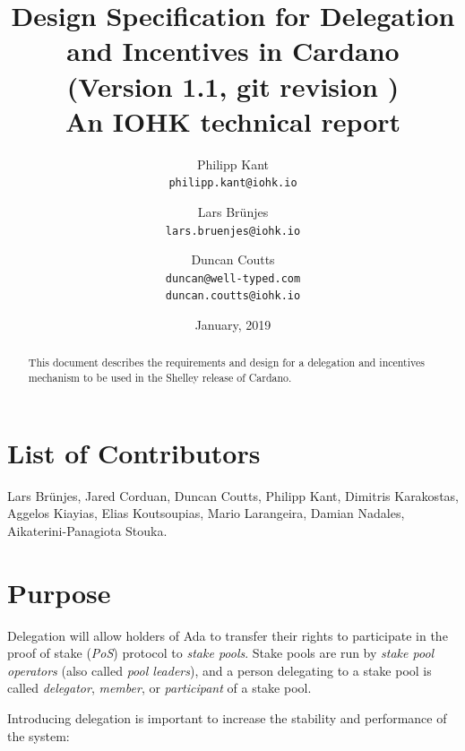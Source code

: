 \documentclass[11pt,a4paper]{article}
\begin{document}
\title{Design Specification for Delegation and Incentives in Cardano \\
       {\small (Version 1.1, git revision \gitAbbrevHash\gitDirty)} \\
       {\large \sc An IOHK technical report}}

\author{Philipp Kant   \\ {\small \texttt{philipp.kant@iohk.io}} \\
   \and Lars Br\"unjes \\ {\small \texttt{lars.bruenjes@iohk.io}} \\
   \and Duncan Coutts  \\ {\small \texttt{duncan@well-typed.com}} \\
                          {\small \texttt{duncan.coutts@iohk.io}}}
\date{January, 2019}

\maketitle

\begin{abstract}
This document describes the requirements and design for a delegation and
incentives mechanism to be used in the Shelley release of Cardano.
\end{abstract}

\section*{List of Contributors}
\label{acknowledgements}

Lars Br\"unjes, Jared Corduan, Duncan Coutts, Philipp Kant,
Dimitris Karakostas, Aggelos Kiayias, Elias Koutsoupias, Mario
Larangeira, Damian Nadales, Aikaterini-Panagiota Stouka.

\tableofcontents
\listoffigures
\listoftodos

\section{Purpose}
\label{purpose}

Delegation will allow holders of Ada to transfer their rights to
participate in the proof of stake (\emph{PoS}) protocol to \emph{stake
pools}. Stake pools are run by \emph{stake pool operators} (also called
\emph{pool leaders}), and a person delegating to a stake pool is called
\emph{delegator}, \emph{member}, or \emph{participant} of a stake pool.

Introducing delegation is important to increase the stability and
performance of the system:
\end{document}
